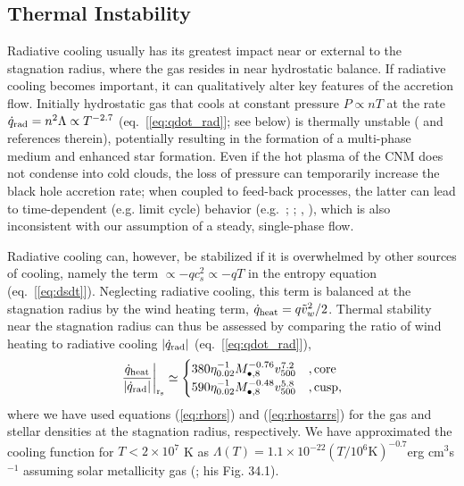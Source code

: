 \documentclass[usenatbib,fleqn]{mn2e}
\begin{document}
\subsection{Thermal Instability}
\label{sec:instability}

Radiative cooling usually has its greatest impact near or external to
the stagnation radius, where the gas resides in near hydrostatic
balance.  If radiative cooling becomes important, it can qualitatively
alter key features of the accretion flow. Initially hydrostatic gas
that cools at constant pressure $P \propto nT$ at the rate
$\dot{q}_{\rm rad} = n^{2}\Lambda \propto T^{-2.7}$
(eq.~[\ref{eq:qdot_rad}]; see below) is thermally unstable
(\citealt{McCourt+12} and references therein), potentially resulting
in the formation of a multi-phase medium and enhanced star formation.
Even if the hot plasma of the CNM does not condense into cold clouds,
the loss of pressure can temporarily increase the black hole accretion
rate; when coupled to feed-back processes, the latter can lead to
time-dependent (e.g. limit cycle) behavior
(e.g.~\citealt{Ciotti&Ostriker07}; \citealt{Ciotti+10};
\citealt{Yuan&Li11}, \citealt{Gan+14}), which is also inconsistent
with our assumption of a steady, single-phase flow.

Radiative cooling can, however, be stabilized if it is overwhelmed by
other sources of cooling, namely the term $\propto -q c_{s}^{2}
\propto -qT$ in the entropy equation (eq.~[\ref{eq:dsdt}]).
Neglecting radiative cooling, this term is balanced at the stagnation
radius by the wind heating term, $\dot{q}_{\rm heat} = q
\tilde{v}_{w}^{2}/2$.  Thermal stability near the stagnation radius
can thus be assessed by comparing the ratio of wind heating to
radiative cooling $|\dot{q}_{\rm rad}|$ (eq.~[\ref{eq:qdot_rad}]),
\begin{align}
\left.\frac{\dot{q}_{\rm heat}}{|\dot{q}_{\rm rad}|}\right|_{\rm r_{\rm s}} \simeq
  \begin{cases}
   380 \eta_{0.02}^{-1} M_{\bullet,8}^{-0.76}v_{500}^{7.2}  &, \text{core}\\
   590 \eta_{0.02}^{-1} M_{\bullet,8}^{-0.48}v_{500}^{5.8}  &, \text{cusp},     
  \end{cases}
  \label{eq:cooling2}
\end{align}
where we have used equations (\ref{eq:rhors}) and (\ref{eq:rhostarrs})
for the gas and stellar densities at the stagnation radius,
respectively.  We have approximated the cooling function for $T <
2\times 10^{7}$ K as $\Lambda(T) = 1.1 \times 10^{-22} \left(T/10^6
  \text{K}\right)^{-0.7} $erg cm$^3 $s$^{-1}$ assuming solar
metallicity gas (\citealt{Draine:2011a}; his Fig. 34.1).
\end{document}
